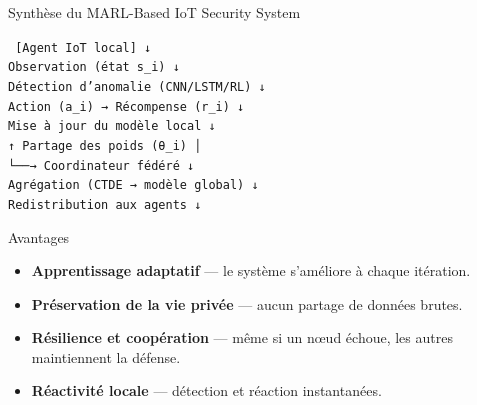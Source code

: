 \documentclass{beamer}
\begin{document}
\begin{frame}{Synthèse du MARL-Based IoT Security System}
\begin{center}
\scriptsize
\texttt{
[Agent IoT local]
  ↓\\
Observation (état s\_i)
  ↓\\
Détection d’anomalie (CNN/LSTM/RL)
  ↓\\
Action (a\_i) → Récompense (r\_i)
  ↓\\
Mise à jour du modèle local
  ↓\\
↑  Partage des poids (θ\_i)
│\\
└──→ Coordinateur fédéré
        ↓\\
 Agrégation (CTDE → modèle global)
        ↓\\
 Redistribution aux agents
        ↓\\
[Exécution décentralisée en temps réel]
}
\end{center}

\vspace{0.3cm}
\begin{block}{Avantages}
\begin{itemize}
    \item  \textbf{Apprentissage adaptatif} — le système s’améliore à chaque itération.
    \item  \textbf{Préservation de la vie privée} — aucun partage de données brutes.
    \item  \textbf{Résilience et coopération} — même si un nœud échoue, les autres maintiennent la défense.
    \item  \textbf{Réactivité locale} — détection et réaction instantanées.
\end{itemize}
\end{block}
\end{frame}
\end{document}
